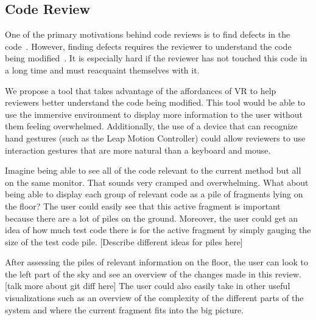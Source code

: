 \documentclass{acm_proc_article-sp}
\begin{document}
\subsection{Code Review}
One of the primary motivations behind code reviews is to find defects in the code~\cite{bacchelli:ModernCodeReviewChallenges}. However, finding defects requires the reviewer to understand the code being modified~\cite{bacchelli:ModernCodeReviewChallenges}. It is especially hard if the reviewer has not touched this code in a long time and must reacquaint themselves with it.

We propose a tool that takes advantage of the affordances of VR to help reviewers better understand the code being modified. This tool would be able to use the immersive environment to display more information to the user without them feeling overwhelmed. Additionally, the use of a device that can recognize hand gestures (such as the Leap Motion Controller) could allow reviewers to use interaction gestures that are more natural than a keyboard and mouse. 

    
 Imagine being able to see all of the code relevant to the current method but all on the same monitor. That sounds very cramped and overwhelming. What about being able to display each group of relevant code as a pile of fragments lying on the floor? The user could easily see that this active fragment is important because there are a lot of piles on the ground. Moreover, the user could get an idea of how much test code there is for the active fragment by simply gauging the size of the test code pile. [Describe different ideas for piles here]
 
 After assessing the piles of relevant information on the floor, the user can look to the left part of the sky and see an overview of the changes made in this review. [talk more about git diff here]
 The user could also easily take in other useful visualizations such as an overview of the complexity of the different parts of the system and where the current fragment fits into the big picture.
    
\end{document}
